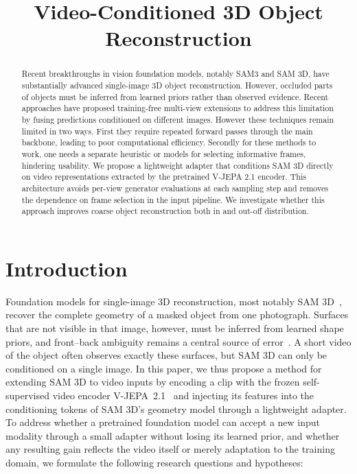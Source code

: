 \documentclass{article}
\title{Video-Conditioned 3D Object Reconstruction}
\begin{document}
\maketitle

\begin{abstract}
Recent breakthroughs in vision foundation models, notably SAM3 and SAM 3D, have substantially advanced single-image 3D object reconstruction. However, occluded parts of objects must be inferred from learned priors rather than observed evidence. Recent approaches have proposed training-free multi-view extensions to address this limitation by fusing predictions conditioned on different images. However these techniques remain limited in two ways. First they require repeated forward passes through the main backbone, leading to poor computational efficiency. Secondly for these methods to work, one needs a separate heuristic or models for selecting informative frames, hindering usability. We propose a lightweight adapter that conditions SAM 3D directly on video representations extracted by the pretrained V-JEPA 2.1 encoder. This architecture avoids per-view generator evaluations at each sampling step and removes the dependence on frame selection in the input pipeline. We investigate whether this approach improves coarse object reconstruction both in and out-off distribution.

\end{abstract}

\section{Introduction}
Foundation models for single-image 3D reconstruction, most notably SAM 3D~\cite{sam3d}, recover the complete geometry of a masked object from one photograph. Surfaces that are not visible in that image, however, must be inferred from learned shape priors, and front--back ambiguity remains a central source of error~\cite{front2back}. A short video of the object often observes exactly these surfaces, but SAM 3D can only be conditioned on a single image. In this paper, we thus propose a method for extending SAM 3D to video inputs by encoding a clip with the frozen self-supervised video encoder V-JEPA~2.1~\cite{vjepa21} and injecting its features into the conditioning tokens of SAM 3D's geometry model through a lightweight adapter. To address whether a pretrained foundation model can accept a new input modality through a small adapter without losing its learned prior, and whether any resulting gain reflects the video itself or merely adaptation to the training domain, we formulate the following research questions and hypotheses:
\end{document}
